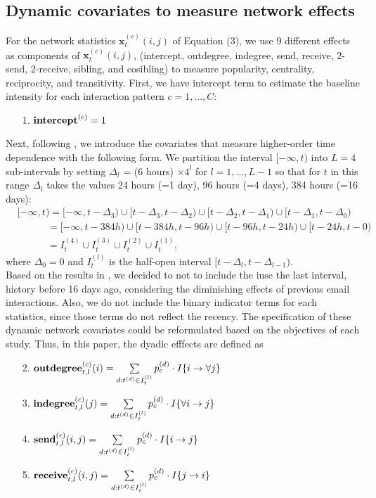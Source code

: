 \documentclass[a4paper]{article}
\begin{document}
 \subsection{Dynamic covariates to measure network effects} \label{subsec: Dynamic covariates2}
 For the network statistics $\boldsymbol{x}^{(c)}_t(i, j)$ of Equation (3), we use 9 different effects as components of $\boldsymbol{x}^{(c)}_t(i, j)$, (intercept, outdegree, indegree, send, receive, 2-send, 2-receive, sibling, and cosibling) to measure popularity, centrality, reciprocity, and transitivity. First, we have intercept term to estimate the baseline intensity for each interaction pattern $c=1,...,C$:
 \begin{itemize}
	\item [1.] $\mbox{\textbf{intercept}}^{(c)}= 1$
 \end{itemize}
Next, following \cite{PerryWolfe2012}, we introduce the covariates that measure higher-order time dependence with the following
form. We partition the interval $[-\infty, t)$ into $L=4$ sub-intervals by setting $\Delta_l$ = (6 hours) $\times  4^l$ for $l=1,...,L-1$ so that for $t$ in this range $\Delta_l$ takes the values 24 hours (=1 day), 96 hours (=4 days), 384 hours (=16 days): 
\begin{equation*}
\begin{aligned}
&[-\infty,t) =[-\infty,t-\Delta_3)\cup [t-\Delta_3, t-\Delta_{2}) \cup [t-\Delta_{2}, t-\Delta_{1})\cup [t-\Delta_1, t-\Delta_{0})\\& \quad\quad\quad= [-\infty,t-384h)\cup [t-384h, t-96h) \cup [t-96h, t-24h)\cup [t-24h, t-0)
\\& \quad\quad\quad=I_t^{(4)}\cup  I_t^{(3)}\cup  I_t^{(2)}\cup I_t^{(1)},
\end{aligned}
\end{equation*}
where $\Delta_0 = 0$ and $I_{t}^{(l)} $ is the half-open interval $[t-\Delta_l, t-\Delta_{l-1})$. \\ \newline Based on the results in \cite{PerryWolfe2012}, we decided to not to include the iuse the last interval, history before 16 days ago, considering the diminishing effects of previous email interactions. Also, we do not include the binary indicator terms for each statistics, since those terms do not reflect the recency. The specification of these dynamic network covariates could be reformulated based on the objectives of each study. Thus, in this paper, the dyadic efffects are defined as
 \begin{itemize}
 	 	 \item [2.]  $\mbox{\textbf{outdegree}}^{(c)}_{t, l}(i)=\sum\limits_{d: t^{(d)} \in I_{t}^{(l)}}p_c^{(d)}\cdot I\{i\rightarrow \forall j\}$
 	 	 \item [3.] $\mbox{\textbf{indegree}}^{(c)}_{t, l}(j)=\sum\limits_{d: t^{(d)} \in I_{t}^{(l)}}p_c^{(d)}\cdot I\{\forall i \rightarrow j\}$	 	 	
 	 	 \item [4.]  $\mbox{\textbf{send}}^{(c)}_{t, l}(i, j)=\sum\limits_{d: t^{(d)} \in I_{t}^{(l)}}p_c^{(d)}\cdot I\{i\rightarrow j\}$
 	\item [5.] $\mbox{\textbf{receive}}^{(c)}_{t, l}(i, j)=\sum\limits_{d: t^{(d)} \in I_{t}^{(l)}}p_c^{(d)}\cdot I\{j\rightarrow i\}$
 \end{itemize}
\end{document}

